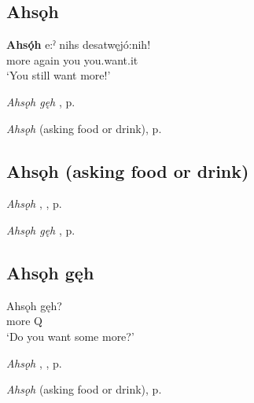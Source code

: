 \subsection*{\textbf{Ahsǫh} } \label{p:[ahsǫh] ‘more’}

\ea
\label{ex:apart7}
\gll \textbf{Ahsǫ́h} e:ˀ nihs desatwęjó:nih!\\
more again you you.want.it\\
\glt ‘You still want more!’
\z

\begin{CayugaRelated}
\item \textit{Ahsǫh gęh} , p. \pageref{p:[ahsǫh] ‘more’}\\
\item \textit{Ahsǫh}  (asking food or drink), p. \pageref{p:[ahsǫh] ‘more’ (asking food or drink)}
\end{CayugaRelated}


\subsection*{\textbf{Ahsǫh}  (asking food or drink)} \label{p:[ahsǫh] ‘more’ (asking food or drink)}

\begin{CayugaRelated}
\item \textit{Ahsǫh} , , p. \pageref{p:[ahsǫh] ‘still’, ‘yet’}\\
\item \textit{Ahsǫh gęh} , p. \pageref{p:[ahsǫh] ‘more’}
\end{CayugaRelated}


\subsection*{\textbf{Ahsǫh gęh} } \label{p:[ahsǫh gęh]}

\ea
\label{ex:apart8}
\gll Ahsǫh gęh?\\
more Q\\
\glt ‘Do you want some more?’
\z

\begin{CayugaRelated}
\item \textit{Ahsǫh} , , p. \pageref{p:[ahsǫh] ‘still’, ‘yet’}\\
\item \textit{Ahsǫh}  (asking food or drink), p. \pageref{p:[ahsǫh] ‘more’ (asking food or drink)}
\end{CayugaRelated}

